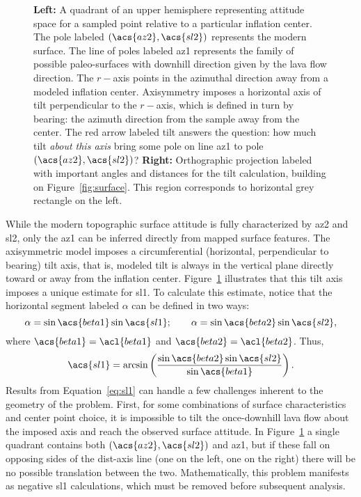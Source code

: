 \begin{figure}
\begin{center}
    \caption[\Acl{tilt} from mapping]{\textbf{Left:} A quadrant of an upper hemisphere representing attitude space for a sampled point relative to a particular inflation center. The pole labeled $\left(\acs{az2},\acs{sl2}\right)$ represents the modern surface. The line of poles labeled \acs{az1} represents the family of possible paleo-surfaces with downhill direction given by the lava flow direction. The $r-$axis points in the azimuthal direction away from a modeled inflation center. Axisymmetry imposes a horizontal axis of tilt perpendicular to the $r-$axis, which is defined in turn by \acs{bearing}: the azimuth direction from the sample away from the center. The red arrow labeled \acs{tilt} answers the question: how much tilt \emph{about this axis} bring some pole on line \acs{az1} to pole $\left(\acs{az2},\acs{sl2}\right)$? \textbf{Right:} Orthographic projection labeled with important angles and distances for the tilt calculation, building on Figure~\ref{fig:surface}. This region corresponds to horizontal grey rectangle on the left.}%
    \label{fig:tilt-from-map}%
\end{center}
\end{figure}
While the modern topographic surface attitude is fully characterized by \acf{az2} and \acf{sl2}, only the \acf{az1} can be inferred directly from mapped surface features. The axisymmetric model imposes a circumferential (horizontal, perpendicular to \acs{bearing}) tilt axis, that is, modeled tilt is always in the vertical plane directly toward or away from the inflation center. Figure~\ref{fig:tilt-from-map} illustrates that this tilt axis imposes a unique estimate for \acf{sl1}. To calculate this estimate, notice that the horizontal segment labeled $\alpha$ can be defined in two ways:
\begin{equation*}
    \alpha = \sin\acs{beta1}\sin\acs{sl1};\qquad
    \alpha = \sin\acs{beta2}\sin\acs{sl2},
\end{equation*}
where $\acs{beta1} = \acl{beta1}$ and $\acs{beta2} = \acl{beta2}$. Thus,
\begin{equation}
    \acs{sl1} = \arcsin\left(\frac{\sin\acs{beta2}\sin\acs{sl2}}{\sin\acs{beta1}}\right).\label{eq:sl1}
\end{equation}
Results from Equation~\eqref{eq:sl1} can handle a few challenges inherent to the geometry of the problem. First, for some combinations of surface characteristics and center point choice, it is impossible to tilt the once-downhill lava flow about the imposed axis and reach the observed surface attitude. In Figure~\ref{fig:tilt-from-map} a single quadrant contains both $\left(\acs{az2},\acs{sl2}\right)$ and \acs{az1}, but if these fall on opposing sides of the \acs{dist}-axis line (one on the left, one on the right) there will be no possible translation between the two. Mathematically, this problem manifests as negative \acf{sl1} calculations, which must be removed before subsequent analysis.

